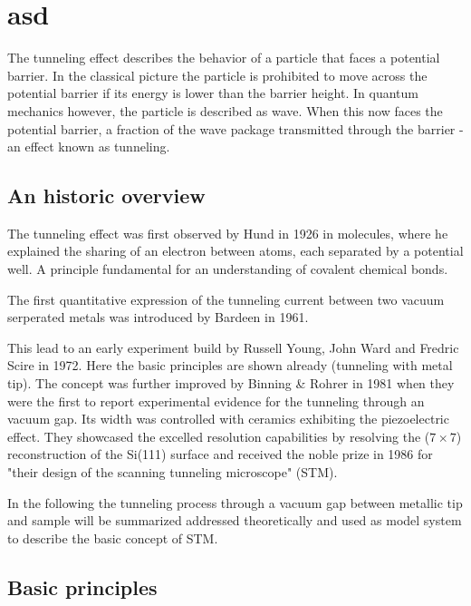 \documentclass[
10pt,					%
a4paper,				%
twoside,				%
BCOR=8mm,				%
headings=normal,		%
headsepline,			%
footsepline,			%
plainfootsepline,		%
]{scrbook}
\begin{document}
\section{asd}
The tunneling effect describes the behavior of a particle that faces a potential barrier. In the classical picture the particle is prohibited to move across the potential barrier if its energy is lower than the barrier height. In quantum mechanics however, the particle is described as wave. When this now faces the potential barrier, a fraction of the wave package transmitted through the barrier - an effect known as tunneling.

\subsection{An historic overview}
The tunneling effect was first observed by Hund in 1926 in molecules, where he explained the sharing of an electron between atoms, each separated by a potential well.\cite{Mehra_tunneling_1982} A principle fundamental for an understanding of covalent chemical bonds. 

The first quantitative expression of the tunneling current between two vacuum serperated metals was introduced by Bardeen in 1961.\cite{Bardeen_tunneling_1961} 

This lead to an early experiment build by Russell Young, John Ward and Fredric Scire in 1972.\cite{Young_topographiner_1972} Here the basic principles are shown already (tunneling with metal tip). The concept was further improved by Binning \& Rohrer in 1981 \cite{binning_tunneling_1982} when they were the first to report experimental evidence for the tunneling through an vacuum gap. Its width was controlled with ceramics exhibiting the piezoelectric effect. They showcased the excelled resolution capabilities by resolving the ($7 \times 7$) reconstruction of the Si(111) surface \cite{binnig_1983} and received the noble prize in 1986 for "their design of the scanning tunneling microscope" (STM).\cite{_noble_price_1986} 

In the following the tunneling process through a vacuum gap between metallic tip and sample will be summarized addressed theoretically and used as model system to describe the basic concept of STM.

\subsection{Basic principles}
\end{document}
